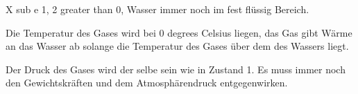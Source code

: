 X sub e 1, 2 greater than 0, Wasser immer noch im fest flüssig Bereich.

Die Temperatur des Gases wird bei 0 degrees Celsius liegen, das Gas gibt Wärme an das Wasser ab solange die Temperatur des Gases über dem des Wassers liegt.

Der Druck des Gases wird der selbe sein wie in Zustand 1. Es muss immer noch den Gewichtskräften und dem Atmosphärendruck entgegenwirken.